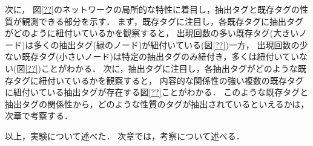 次に，
図\ref{??}のネットワークの局所的な特性に着目し，抽出タグと既存タグの性質が観測できる部分を示す．
まず，既存タグに注目し，各既存タグに抽出タグがどのように紐付いているかを観察すると，
出現回数の多い既存タグ(大きいノード)は多くの抽出タグ(緑のノード)が紐付いている(図\ref{??})一方，
出現回数の少ない既存タグ(小さいノード)は特定の抽出タグのみ紐付き，多くは紐付いていない(図\ref{??})ことがわかる．
次に，抽出タグに注目し，各抽出タグがどのような既存タグに紐付いているかを観察すると，
内容的な関係性の強い複数の既存タグに紐付いている抽出タグが存在する{図\ref{??}}ことがわかる．	
このような既存タグと抽出タグの関係性から，どのような性質のタグが抽出されているといえるかは，次章で考察する．



\vvspace
以上，実験について述べた．
次章では，考察について述べる．



